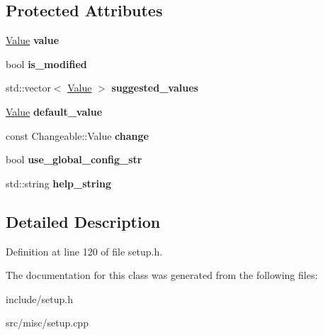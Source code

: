 \subsection*{Protected Attributes}
\begin{DoxyCompactItemize}
\item 
\hypertarget{classProperty_ab9f796553f3beee1cc6a4c4a9d352f28}{\hyperlink{classValue}{Value} {\bfseries value}}\label{classProperty_ab9f796553f3beee1cc6a4c4a9d352f28}

\item 
\hypertarget{classProperty_a478478c72fd7da282d03c652f567bc68}{bool {\bfseries is\-\_\-modified}}\label{classProperty_a478478c72fd7da282d03c652f567bc68}

\item 
\hypertarget{classProperty_a358f5bbc412ec7db0f8ae400eb419d9a}{std\-::vector$<$ \hyperlink{classValue}{Value} $>$ {\bfseries suggested\-\_\-values}}\label{classProperty_a358f5bbc412ec7db0f8ae400eb419d9a}

\item 
\hypertarget{classProperty_adafc47b2053f75c1bb1811bcf7ffdd1a}{\hyperlink{classValue}{Value} {\bfseries default\-\_\-value}}\label{classProperty_adafc47b2053f75c1bb1811bcf7ffdd1a}

\item 
\hypertarget{classProperty_a8a01484c2e7a8cfcf98f01ed3a0fa293}{const Changeable\-::\-Value {\bfseries change}}\label{classProperty_a8a01484c2e7a8cfcf98f01ed3a0fa293}

\item 
\hypertarget{classProperty_abd3b538752e5d6d649dc323ce46591be}{bool {\bfseries use\-\_\-global\-\_\-config\-\_\-str}}\label{classProperty_abd3b538752e5d6d649dc323ce46591be}

\item 
\hypertarget{classProperty_a9a0f13a48b56868da27ec1e33fd0414c}{std\-::string {\bfseries help\-\_\-string}}\label{classProperty_a9a0f13a48b56868da27ec1e33fd0414c}

\end{DoxyCompactItemize}


\subsection{Detailed Description}


Definition at line 120 of file setup.\-h.



The documentation for this class was generated from the following files\-:\begin{DoxyCompactItemize}
\item 
include/setup.\-h\item 
src/misc/setup.\-cpp\end{DoxyCompactItemize}
